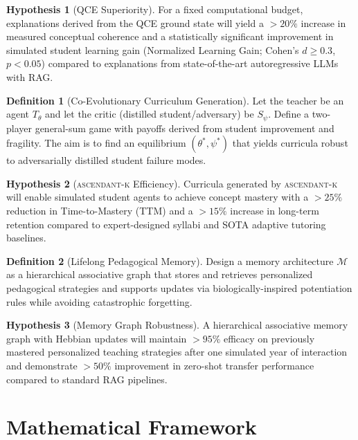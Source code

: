 \documentclass[12pt,oneside]{report}
\newcommand{\framework}[1]{\textsc{#1}}
\newcommand{\ascendantk}{\framework{ascendant-k}}
\theoremstyle{definition}
\newtheorem{definition}{Definition}[chapter]
\newtheorem{hypothesis}{Hypothesis}[chapter]
\theoremstyle{plain}
\theoremstyle{remark}
\begin{document}
\begin{hypothesis}[QCE Superiority]
For a fixed computational budget, explanations derived from the QCE ground state will yield a $>20\%$ increase in measured conceptual coherence and a statistically significant improvement in simulated student learning gain (Normalized Learning Gain; Cohen's $d \ge 0.3$, $p<0.05$) compared to explanations from state-of-the-art autoregressive LLMs with RAG.
\end{hypothesis}

\begin{definition}[Co-Evolutionary Curriculum Generation]
Let the teacher be an agent $T_\theta$ and let the critic (distilled student/adversary) be $S_\psi$. Define a two-player general-sum game with payoffs derived from student improvement and fragility. The aim is to find an equilibrium $(\theta^\ast,\psi^\ast)$ that yields curricula robust to adversarially distilled student failure modes.
\end{definition}

\begin{hypothesis}[\ascendantk{} Efficiency]
Curricula generated by \ascendantk{} will enable simulated student agents to achieve concept mastery with a $>25\%$ reduction in Time-to-Mastery (TTM) and a $>15\%$ increase in long-term retention compared to expert-designed syllabi and SOTA adaptive tutoring baselines.
\end{hypothesis}

\begin{definition}[Lifelong Pedagogical Memory]
Design a memory architecture $\mathcal{M}$ as a hierarchical associative graph that stores and retrieves personalized pedagogical strategies and supports updates via biologically-inspired potentiation rules while avoiding catastrophic forgetting.
\end{definition}

\begin{hypothesis}[Memory Graph Robustness]
A hierarchical associative memory graph with Hebbian updates will maintain $>95\%$ efficacy on previously mastered personalized teaching strategies after one simulated year of interaction and demonstrate $>50\%$ improvement in zero-shot transfer performance compared to standard RAG pipelines.
\end{hypothesis}

\chapter{Mathematical Framework}
\end{document}
